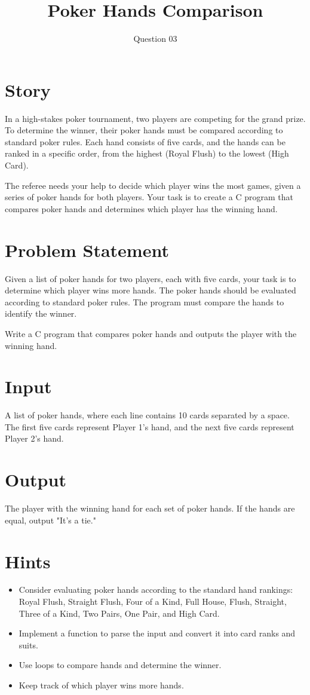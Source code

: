 \documentclass{article}
\title{Poker Hands Comparison}
\author{Question 03}
\date{}
\begin{document}
\maketitle
\thispagestyle{empty} %

\section*{Story}
In a high-stakes poker tournament, two players are competing for the grand prize. To determine the winner, their poker hands must be compared according to standard poker rules. Each hand consists of five cards, and the hands can be ranked in a specific order, from the highest (Royal Flush) to the lowest (High Card). 

The referee needs your help to decide which player wins the most games, given a series of poker hands for both players. Your task is to create a C program that compares poker hands and determines which player has the winning hand.

\section*{Problem Statement}
Given a list of poker hands for two players, each with five cards, your task is to determine which player wins more hands. The poker hands should be evaluated according to standard poker rules. The program must compare the hands to identify the winner. 

Write a C program that compares poker hands and outputs the player with the winning hand.

\section*{Input}
A list of poker hands, where each line contains 10 cards separated by a space. The first five cards represent Player 1's hand, and the next five cards represent Player 2's hand.

\section*{Output}
The player with the winning hand for each set of poker hands. If the hands are equal, output "It's a tie."

\section*{Hints}
\begin{itemize}
    \item Consider evaluating poker hands according to the standard hand rankings: Royal Flush, Straight Flush, Four of a Kind, Full House, Flush, Straight, Three of a Kind, Two Pairs, One Pair, and High Card.
    \item Implement a function to parse the input and convert it into card ranks and suits.
    \item Use loops to compare hands and determine the winner.
    \item Keep track of which player wins more hands.
\end{itemize}
\end{document}
